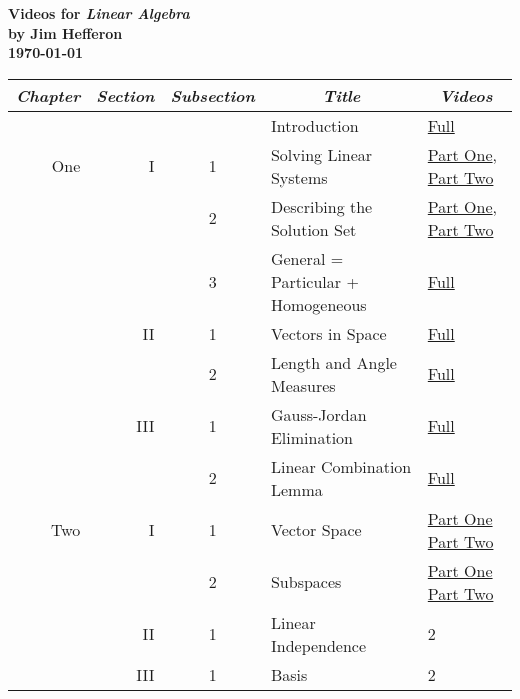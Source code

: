 \documentclass{article}
\begin{document}
\thispagestyle{empty}
\begin{center}
  \LARGE\textbf{Videos for \textit{Linear Algebra}} \\[1ex]
  \Large\textbf{by Jim Hef{}feron}\\[0.3ex]
  \Large\textbf{\today}\\
\end{center}
\vspace{3ex}
\begin{center}
\begin{tabular}{|rrc|ll|}
  \multicolumn{1}{c}{\textit{Chapter}} 
  &\multicolumn{1}{c}{\textit{Section}} 
  &\multicolumn{1}{c}{\textit{Subsection}} 
  &\multicolumn{1}{c}{\textit{Title}} 
  &\multicolumn{1}{c}{\textit{Videos}} 
  \\ \hline
      &    &  &Introduction          &\href{https://youtu.be/i-aS6VrDomg}{Full}   \\
 \hline
  One &I   &1 &Solving Linear Systems             &\href{https://youtu.be/4e6AsXVIsFc}{Part One}, \href{https://youtu.be/lhkdzfWfwp0}{Part Two}   \\
      &    &2 &Describing the Solution Set        &\href{https://youtu.be/ExVBc05YQPg}{Part One}, \href{https://youtu.be/ZatFu5GVFbo}{Part Two}   \\
      &    &3 &General = Particular + Homogeneous &\href{https://youtu.be/OcayHebo62Q}{Full}   \\
      \cline{4-5}
      &II  &1  &Vectors in Space                  &\href{https://youtu.be/5UpMGlhtVf4}{Full}   \\
      &    &2  &Length and Angle Measures         &\href{https://youtu.be/-vzdOIP-a5A}{Full}   \\
      \cline{4-5}
      &III &1  &Gauss-Jordan Elimination            &\href{https://youtu.be/Q0UGClfdgCg}{Full}   \\
      &    &2  &Linear Combination Lemma          &\href{https://youtu.be/QTfFmEUhQlE}{Full}   \\
 \hline
 Two  &I   &1 &Vector Space                       &\href{https://youtu.be/LIGgeCkcr6A}{Part One} \href{https://youtu.be/UU6FSncoWJs}{Part Two}   \\
      &    &2 &Subspaces                          &\href{https://youtu.be/SHh7sp3Tedc}{Part One} \href{}{Part Two}   \\
      \cline{4-5}
      &II  &1 &Linear Independence                &2   \\
      \cline{4-5}
      &III &1 &Basis                              &2   \\

\end{tabular}
\end{center}
\end{document}
